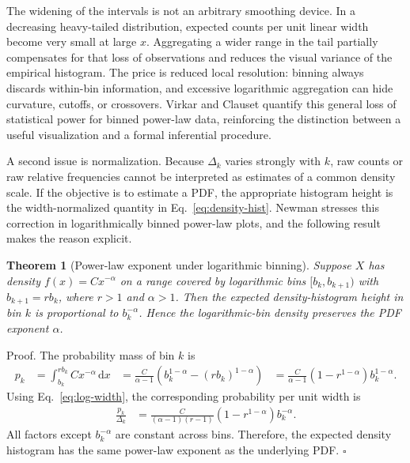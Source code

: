 \documentclass[12pt]{article}
\def\textbf#1{#1}%
\def\\{ }%
\newcommand{\dd}{{\mathrm{d}}}
\newtheorem{theorem}{Theorem}[section]
\newenvironment{demonstration}
{\par\noindent\textbf{Proof.}}
{\hfill$\square$\par}
\numberwithin{equation}{section}
\begin{document}
The widening of the intervals is not an arbitrary smoothing device. In a decreasing heavy-tailed distribution, expected counts per unit linear width become very small at large $x$. Aggregating a wider range in the tail partially compensates for that loss of observations and reduces the visual variance of the empirical histogram. The price is reduced local resolution: binning always discards within-bin information, and excessive logarithmic aggregation can hide curvature, cutoffs, or crossovers. Virkar and Clauset \cite{VirkarClauset2014} quantify this general loss of statistical power for binned power-law data, reinforcing the distinction between a useful visualization and a formal inferential procedure.

A second issue is normalization. Because $\Delta_k$ varies strongly with $k$, raw counts or raw relative frequencies cannot be interpreted as estimates of a common density scale. If the objective is to estimate a PDF, the appropriate histogram height is the width-normalized quantity in Eq.~\eqref{eq:density-hist}. Newman \cite{Newman2005} stresses this correction in logarithmically binned power-law plots, and the following result makes the reason explicit.

\begin{theorem}[Power-law exponent under logarithmic binning]
Suppose $X$ has density $f(x)=Cx^{-\alpha}$ on a range covered by logarithmic bins $[b_k,b_{k+1})$ with $b_{k+1}=rb_k$, where $r>1$ and $\alpha>1$. Then the expected density-histogram height in bin $k$ is proportional to $b_k^{-\alpha}$. Hence the logarithmic-bin density preserves the PDF exponent $\alpha$.
\end{theorem}

\begin{demonstration}
The probability mass of bin $k$ is
\begin{align}
 p_k
 &=\int_{b_k}^{rb_k}Cx^{-\alpha}\,\dd x\\
 &=\frac{C}{\alpha-1}
 \left(b_k^{1-\alpha}-(rb_k)^{1-\alpha}\right)\\
 &=\frac{C}{\alpha-1}
 \left(1-r^{1-\alpha}\right)b_k^{1-\alpha}.
\end{align}
Using Eq.~\eqref{eq:log-width}, the corresponding probability per unit width is
\begin{align}
 \frac{p_k}{\Delta_k}
 &=\frac{C}{(\alpha-1)(r-1)}
 \left(1-r^{1-\alpha}\right)b_k^{-\alpha}.
\end{align}
All factors except $b_k^{-\alpha}$ are constant across bins. Therefore, the expected density histogram has the same power-law exponent as the underlying PDF.
\end{demonstration}
\end{document}
